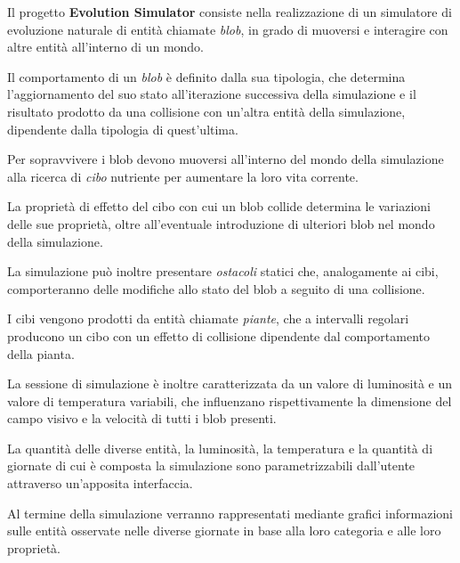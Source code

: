 Il progetto \textbf{Evolution Simulator} consiste nella realizzazione di un simulatore di evoluzione naturale di entità chiamate \textit{blob}, in grado di muoversi e interagire con altre entità all'interno di un mondo.

Il comportamento di un \textit{blob} è definito dalla sua tipologia, che determina l'aggiornamento del suo stato all'iterazione successiva della simulazione e il risultato prodotto da una collisione con un'altra entità della simulazione, dipendente dalla tipologia di quest'ultima.

Per sopravvivere i blob devono muoversi all'interno del mondo della simulazione alla ricerca di \textit{cibo} nutriente per aumentare la loro vita corrente.

La proprietà di effetto del cibo con cui un blob collide determina le variazioni delle sue proprietà, oltre all'eventuale introduzione di ulteriori blob nel mondo della simulazione. 

La simulazione può inoltre presentare \textit{ostacoli} statici che, analogamente ai cibi, comporteranno delle modifiche allo stato del blob a seguito di una collisione.

I cibi vengono prodotti da entità chiamate \textit{piante}, che a intervalli regolari producono un cibo con un effetto di collisione dipendente dal comportamento della pianta.

La sessione di simulazione è inoltre caratterizzata da un valore di luminosità e un valore di temperatura variabili, che influenzano rispettivamente la dimensione del campo visivo e la velocità di tutti i blob presenti.

La quantità delle diverse entità, la luminosità, la temperatura e la quantità di giornate di cui è composta la simulazione sono parametrizzabili dall'utente attraverso un'apposita interfaccia.

Al termine della simulazione verranno rappresentati mediante grafici informazioni sulle entità osservate nelle diverse giornate in base alla loro categoria e alle loro proprietà.